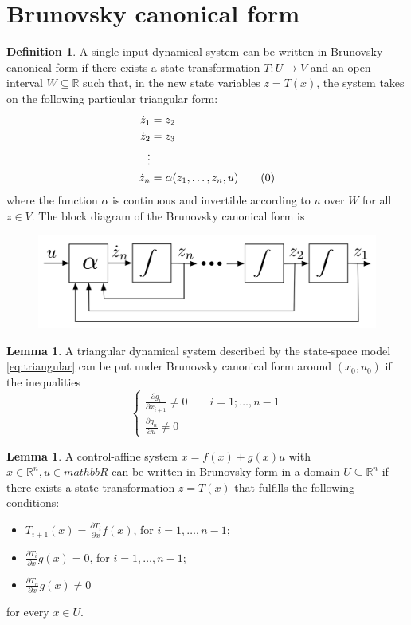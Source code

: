 \documentclass[12pt, openany]{report}
\theoremstyle{definition}
\newtheorem{definition}[thm]{Definition}
\newtheorem{lem}[thm]{Lemma}
\newcommand{\R}{\mathbb{R}}
\begin{document}
\section{Brunovsky canonical form}
\begin{definition} A single input dynamical system can be written in Brunovsky canonical form if there exists a state transformation \(T:U\rightarrow V\) and an open interval \(W\subseteq \R\) such that, in the new state variables \(z=T(x)\), the system takes on the following particular triangular form:
\begin{align}
    \dot z_1 &= z_2\nonumber\\
    \dot z_2 &= z_3\nonumber\\
    \vdots&\nonumber\\
    \dot z_n &= \alpha(z_1,\dots,z_n,u)\tag{\theequation}  \refstepcounter{equation}
\end{align}
where the function \(\alpha\) is continuous and invertible according to \(u\) over \(W\) for all \(z\in V\). The block diagram of the Brunovsky canonical form is
\begin{figure}[H]
    \centering
    \includegraphics[width = .5\textwidth]{img/block_brunovsky.png}
\end{figure}
\end{definition}
\begin{lem}
    A triangular dynamical system described by the state-space model \eqref{eq:triangular} can be put under Brunovsky canonical form around \((x_0,u_0)\) if the inequalities 
    \begin{equation}
        \begin{cases}
            \frac{\partial g_i}{\partial x_{i+1}}\neq 0 \qquad i=1;\dots,n-1\\
            \frac{\partial g_n}{\partial u}\neq 0
        \end{cases}
    \end{equation}
\end{lem}
\begin{lem}
    A control-affine system \(\dot x =f(x)+g(x)u\) with \(x\in \R^n,u\in mathbb{R}\) can be written in Brunovsky form in a domain \(U\subseteq \R^n\) if there exists a state transformation \(z=T(x)\) that fulfills the following conditions:
\end{lem}
\begin{itemize}
    \item \(T_{i+1}(x) = \frac{\partial T_i}{\partial x}f(x)\), for \(i=1,\dots,n-1\);
    \item \(\frac{\partial T_i}{\partial x}g(x)= 0\), for \(i=1,\dots,n-1\);
    \item \(\frac{\partial T_n}{\partial x}g(x)\neq 0\)
\end{itemize}
for every \(x\in U\).
\end{document}
